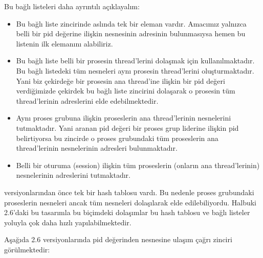 \documentclass[a4paper,10pt,turkish]{sphinxmanual}
\begin{document}
\sphinxAtStartPar
Bu bağlı listeleri daha ayrıntılı açıklayalım:
\begin{itemize}
\item {} 
\sphinxAtStartPar
{} Bu bağlı liste zincirinde aslında tek bir eleman vardır. Amacımız yalnızca belli
bir pid değerine ilişkin  nesnesinin adresinin bulunmasıysa hemen bu listenin ilk
elemanını alabiliriz.

\item {} 
\sphinxAtStartPar
{} Bu bağlı liste belli bir prosesin thread’lerini dolaşmak için kullanılmaktadır.
Bu bağlı listedeki tüm  nesneleri aynı prosesin thread’lerini oluşturmaktadır. Yani
biz çekirdeğe bir prosesin ana thread’ine ilişkin bir pid değeri verdiğimizde çekirdek bu bağlı
liste zincirini dolaşarak o prosesin tüm thread’lerinin  adreslerini elde
edebilmektedir.

\item {} 
\sphinxAtStartPar
{} Aynı proses grubuna ilişkin proseslerin ana thread’lerinin 
nesnelerini tutmaktadır. Yani aranan pid değeri bir proses grup liderine ilişkin pid belirtiyorsa bu
zincirde o proses grubundaki tüm proseslerin ana thread’lerinin  nesnelerinin
adresleri bulunmaktadır.

\item {} 
\sphinxAtStartPar
{} Belli bir oturuma (session) ilişkin tüm proseslerin (onların ana thread’lerinin)
 nesnelerinin adreslerini tutmaktadır.

\end{itemize}

 versiyonlarından önce tek bir hash tablosu vardı. Bu nedenle proses grubundaki proseslerin
 nesneleri ancak tüm  nesneleri dolaşılarak elde edilebiliyordu.
Halbuki 2.6’daki bu tasarımla bu biçimdeki dolaşımlar bu hash tablosu ve bağlı listeler yoluyla çok
daha hızlı yapılabilmektedir.

\sphinxAtStartPar
Aşağıda 2.6 versiyonlarında pid değerinden  nesnesine ulaşım çağrı zinciri
görülmektedir:

\end{document}
